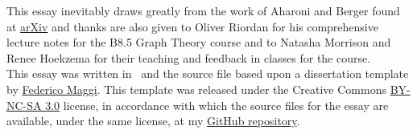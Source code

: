 \begin{acky}
\noindent This essay inevitably draws greatly from the work of Aharoni and Berger found at \href{http://arxiv.org/pdf/math/0509397.pdf}{arXiv} and thanks are also given to Oliver Riordan for his comprehensive lecture notes for the B8.5 Graph Theory course and to Natasha Morrison and Renee Hoekzema for their teaching and feedback in classes for the course.\\

\noindent This essay was written in \XeLaTeX\ and the source file based upon a dissertation template by \href{http://www.latextemplates.com/template/maggi-memoir-thesis}{Federico Maggi}. This template was released under the Creative Commons \href{https://creativecommons.org/licenses/by-nc-sa/3.0/}{BY-NC-SA 3.0} license, in accordance with which the source files for the essay are available, under the same license, at my \href{https://github.com/sjt12/Menger}{GitHub repository}.
\end{acky}